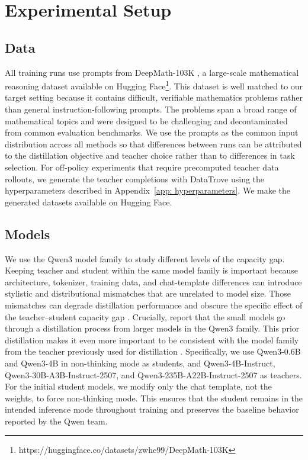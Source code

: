 \chapter{Experimental Setup}

\section{Data}

All training runs use prompts from DeepMath-103K \citep{he2025DeepMath103KLargeScaleChallenging}, a large-scale mathematical reasoning dataset available on Hugging Face\footnote{https://huggingface.co/datasets/zwhe99/DeepMath-103K}. This dataset is well matched to our target setting because it contains difficult, verifiable mathematics problems rather than general instruction-following prompts. The problems span a broad range of mathematical topics and were designed to be challenging and decontaminated from common evaluation benchmarks. We use the prompts as the common input distribution across all methods so that differences between runs can be attributed to the distillation objective and teacher choice rather than to differences in task selection.
For off-policy experiments that require precomputed teacher data rollouts, we generate the teacher completions with DataTrove \citep{penedo2024datatrove} using the hyperparameters described in Appendix~\ref{app: hyperparameters}. We make the generated datasets available on Hugging Face.

\section{Models}

We use the Qwen3 model family \citep{yangQwen3TechnicalReport2025} to study different levels of the capacity gap. Keeping teacher and student within the same model family is important because architecture, tokenizer, training data, and chat-template differences can introduce stylistic and distributional mismatches that are unrelated to model size. Those mismatches can degrade distillation performance and obscure the specific effect of the teacher--student capacity gap \citep{liRethinkingOnPolicyDistillation2026}. Crucially, \citet{yangQwen3TechnicalReport2025} report that the small models go through a distillation process from larger models in the Qwen3 family. This prior distillation makes it even more important to be consistent with the model family from the teacher previously used for distillation \citep{wuLightningOPDEfficient2026}.
Specifically, we use Qwen3-0.6B and Qwen3-4B in non-thinking mode as students, and Qwen3-4B-Instruct, Qwen3-30B-A3B-Instruct-2507, and Qwen3-235B-A22B-Instruct-2507 as teachers. For the initial student models, we modify only the chat template, not the weights, to force non-thinking mode. This ensures that the student remains in the intended inference mode throughout training and preserves the baseline behavior reported by the Qwen team.

